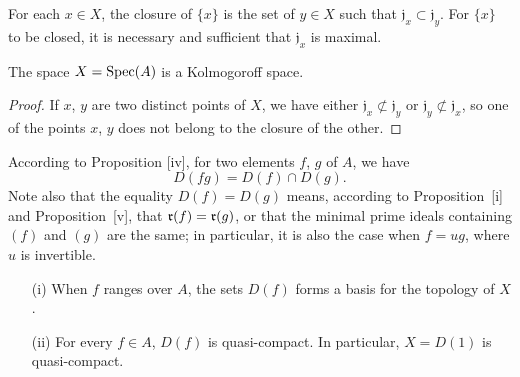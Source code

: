 \begin{corollary}[1.1.7]
\label{1.1.1.7}
For each $x\in X$, the closure of $\{x\}$ is the set of $y\in X$ such that $\mathfrak{j}_x\subset\mathfrak{j}_y$.
For $\{x\}$ to be closed, it is necessary and sufficient that $\mathfrak{j}_x$ is maximal.
\end{corollary}

\begin{corollary}[1.1.8]
\label{1.1.1.8}
The space $X=\operatorname{Spec}(A)$ is a Kolmogoroff space.
\end{corollary}

\begin{proof}
\label{proof-1.1.1.8}
If $x$, $y$ are two distinct points of $X$, we have either $\mathfrak{j}_x\not\subset\mathfrak{j}_y$ or $\mathfrak{j}_y\not\subset\mathfrak{j}_x$, so one of the points $x$, $y$ does not belong to the closure of the other.
\end{proof}

\begin{env}[1.1.9]
\label{1.1.1.9}
According to Proposition [iv], for two elements $f$, $g$ of $A$, we have
\[
  D(fg)=D(f)\cap D(g).
  \tag{1.1.9.1}
\]
Note also that the equality $D(f)=D(g)$ means, according to Proposition~[i] and Proposition~[v], that $\mathfrak{r}(f)=\mathfrak{r}(g)$, or that the minimal prime ideals containing $(f)$ and $(g)$ are the same;
in particular, it is also the case when $f=ug$, where $u$ is invertible.
\end{env}

\begin{proposition}[1.1.10]
\label{1.1.1.10}
\medskip\noindent
{}
\begin{enumerate}
  \item[{\rm(i)}] When $f$ ranges over $A$, the sets $D(f)$ forms a basis for the topology of $X$.
  \item[{\rm(ii)}] For every $f\in A$, $D(f)$ is quasi-compact.
    In particular, $X=D(1)$ is quasi-compact.
\end{enumerate}
\end{proposition}


